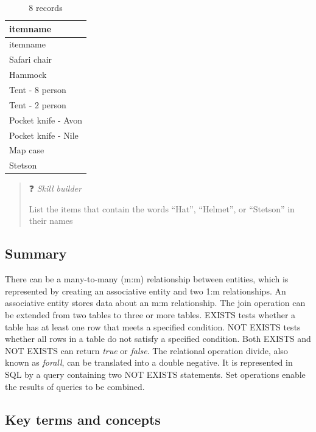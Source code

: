 \documentclass[
]{article}
\begin{document}
\begin{longtable}[]{@{}l@{}}
\caption{8 records}\tabularnewline
\toprule()
itemname \\
\midrule()
\endfirsthead
\toprule()
itemname \\
\midrule()
\endhead
Safari chair \\
Hammock \\
Tent - 8 person \\
Tent - 2 person \\
Pocket knife - Avon \\
Pocket knife - Nile \\
Map case \\
Stetson \\
\bottomrule()
\end{longtable}

\begin{quote}
❓ \emph{Skill builder}

List the items that contain the words ``Hat'', ``Helmet'', or
``Stetson'' in their names
\end{quote}

\hypertarget{summary-2}{%
\subsection*{Summary}\label{summary-2}}

There can be a many-to-many (m:m) relationship between entities, which
is represented by creating an associative entity and two 1:m
relationships. An associative entity stores data about an m:m
relationship. The join operation can be extended from two tables to
three or more tables. EXISTS tests whether a table has at least one row
that meets a specified condition. NOT EXISTS tests whether all rows in a
table do not satisfy a specified condition. Both EXISTS and NOT EXISTS
can return \emph{true} or \emph{false}. The relational operation divide,
also known as \emph{forall}, can be translated into a double negative.
It is represented in SQL by a query containing two NOT EXISTS
statements. Set operations enable the results of queries to be combined.

\hypertarget{key-terms-and-concepts-2}{%
\subsection*{Key terms and concepts}\label{key-terms-and-concepts-2}}
\end{document}
